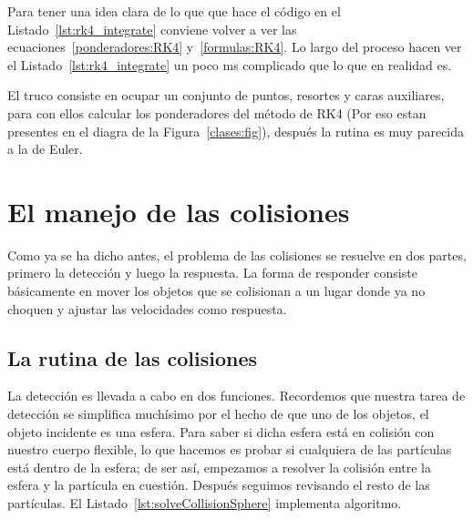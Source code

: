 Para tener una idea clara de lo que que hace el código en el Listado~\ref{lst:rk4_integrate} conviene volver a ver las ecuaciones~\ref{ponderadores:RK4} y~\ref{formulas:RK4}.
Lo largo del proceso hacen ver el Listado~\ref{lst:rk4_integrate} un poco ms complicado que lo que en realidad es.


El truco consiste en ocupar un conjunto de puntos, resortes y caras auxiliares, para con ellos calcular los ponderadores del método de RK4 (Por eso estan presentes en el diagra de la Figura~\ref{clases:fig}), después la rutina es muy parecida a la de Euler.

\section{El manejo de las colisiones}
Como ya se ha dicho antes, el problema de las colisiones se resuelve en dos partes, primero la detección y luego la respuesta.
La forma de responder consiste básicamente en mover los objetos que se colisionan a un lugar donde ya no choquen y ajustar las velocidades como respuesta.

\subsection{La rutina de las colisiones}
La detección es llevada a cabo en dos funciones.
Recordemos que nuestra tarea de detección se simplifica muchísimo por el hecho de que uno de los objetos, el objeto incidente es una esfera.
Para saber si dicha esfera está en colisión con nuestro cuerpo flexible, lo que hacemos es probar si cualquiera de las partículas está dentro de la esfera; de ser así, empezamos a resolver la colisión entre la esfera y la partícula en cuestión. Después seguimos revisando el resto de las partículas.
El Listado~\ref{lst:solveCollisionSphere} implementa algoritmo.



